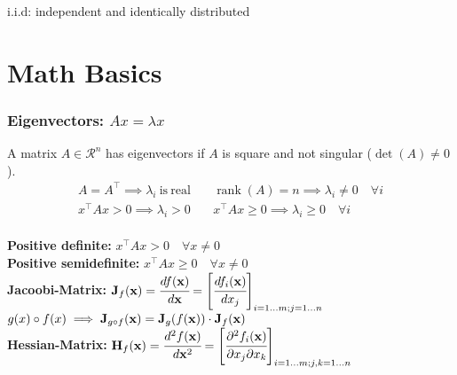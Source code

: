 \begin{mdframed}[style=redbox]
  i.i.d: independent and identically distributed
\end{mdframed}

\section{Math Basics}
\begin{mdframed}[style=eqbox]
\subsubsection*{Eigenvectors: \(A x = \lambda x\)}
A matrix $A \in \mathcal R^n$ has eigenvectors if $A$ is square and not singular (\(\det (A) \neq 0\)).
\vspace*{-4pt}\begin{align*}
  A = A^\top \implies \lambda_i \mathrm{~is~real~} && \operatorname*{rank}(A) = n \implies \lambda_i \neq 0 \quad \forall i\\
  x^\top A x > 0 \implies \lambda_i > 0 && x^\top A x \geq 0 \implies \lambda_i \geq 0 \quad \forall i
\end{align*}\vspace*{-16pt}\\
\textbf{Positive definite:} \(x^\top A x > 0 \quad \forall x \neq 0\)\\
\textbf{Positive semidefinite:} \(x^\top A x \geq 0 \quad \forall x \neq 0\)\\
\textbf{Jacoobi-Matrix:} \(\mathbf{J}_f(\mathbf{x}) = \cfrac{d f(\mathbf{x})}{d\mathbf{x}} = \left[\cfrac{df_i(\mathbf x)}{dx_j}\right]_{i = 1\dots m; j = 1\dots n}\)\\
$g(x) \circ f(x) \implies \mathbf{J}_{g \circ f} (\mathbf{x}) = \mathbf{J}_g(f(\mathbf{x})) \cdot \mathbf{J}_f(\mathbf{x})$\\[0.35em]
\textbf{Hessian-Matrix:} \(\mathbf{H}_f(\mathbf{x}) = \cfrac{d^2 f(\mathbf{x})}{d\mathbf{x}^2} = \left[\cfrac{\partial^2 f_i(\mathbf{x})}{\partial x_j\partial x_k}\right]_{i = 1\dots m; j, k = 1\dots n}\)
\end{mdframed}
%
